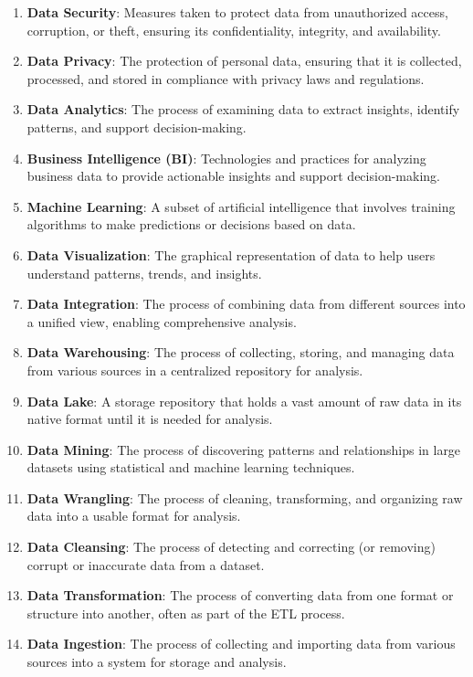 \documentclass[
  letterpaper,
  DIV=11,
  numbers=noendperiod]{scrartcl}
\begin{document}
\begin{enumerate}
\item
  \textbf{Data Security}: Measures taken to protect data from
  unauthorized access, corruption, or theft, ensuring its
  confidentiality, integrity, and availability.
\item
  \textbf{Data Privacy}: The protection of personal data, ensuring that
  it is collected, processed, and stored in compliance with privacy laws
  and regulations.
\item
  \textbf{Data Analytics}: The process of examining data to extract
  insights, identify patterns, and support decision-making.
\item
  \textbf{Business Intelligence (BI)}: Technologies and practices for
  analyzing business data to provide actionable insights and support
  decision-making.
\item
  \textbf{Machine Learning}: A subset of artificial intelligence that
  involves training algorithms to make predictions or decisions based on
  data.
\item
  \textbf{Data Visualization}: The graphical representation of data to
  help users understand patterns, trends, and insights.
\item
  \textbf{Data Integration}: The process of combining data from
  different sources into a unified view, enabling comprehensive
  analysis.
\item
  \textbf{Data Warehousing}: The process of collecting, storing, and
  managing data from various sources in a centralized repository for
  analysis.
\item
  \textbf{Data Lake}: A storage repository that holds a vast amount of
  raw data in its native format until it is needed for analysis.
\item
  \textbf{Data Mining}: The process of discovering patterns and
  relationships in large datasets using statistical and machine learning
  techniques.
\item
  \textbf{Data Wrangling}: The process of cleaning, transforming, and
  organizing raw data into a usable format for analysis.
\item
  \textbf{Data Cleansing}: The process of detecting and correcting (or
  removing) corrupt or inaccurate data from a dataset.
\item
  \textbf{Data Transformation}: The process of converting data from one
  format or structure into another, often as part of the ETL process.
\item
  \textbf{Data Ingestion}: The process of collecting and importing data
  from various sources into a system for storage and analysis.

\end{enumerate}
\end{document}
